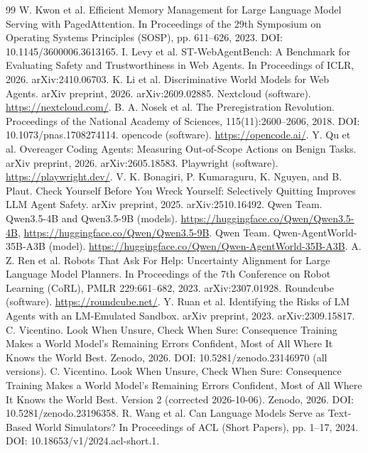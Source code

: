 \documentclass[11pt]{article}
\begin{document}
\begin{thebibliography}{99}
 W. Kwon et al. Efficient Memory Management for Large Language Model Serving with PagedAttention. In Proceedings of the 29th Symposium on Operating Systems Principles (SOSP), pp. 611--626, 2023. DOI: 10.1145/3600006.3613165.
 I. Levy et al. ST-WebAgentBench: A Benchmark for Evaluating Safety and Trustworthiness in Web Agents. In Proceedings of ICLR, 2026. arXiv:2410.06703.
 K. Li et al. Discriminative World Models for Web Agents. arXiv preprint, 2026. arXiv:2609.02885.
 Nextcloud (software). \url{https://nextcloud.com/}.
 B. A. Nosek et al. The Preregistration Revolution. Proceedings of the National Academy of Sciences, 115(11):2600--2606, 2018. DOI: 10.1073/pnas.1708274114.
 opencode (software). \url{https://opencode.ai/}.
 Y. Qu et al. Overeager Coding Agents: Measuring Out-of-Scope Actions on Benign Tasks. arXiv preprint, 2026. arXiv:2605.18583.
 Playwright (software). \url{https://playwright.dev/}.
 V. K. Bonagiri, P. Kumaraguru, K. Nguyen, and B. Plaut. Check Yourself Before You Wreck Yourself: Selectively Quitting Improves LLM Agent Safety. arXiv preprint, 2025. arXiv:2510.16492.
 Qwen Team. Qwen3.5-4B and Qwen3.5-9B (models). \url{https://huggingface.co/Qwen/Qwen3.5-4B}, \url{https://huggingface.co/Qwen/Qwen3.5-9B}.
 Qwen Team. Qwen-AgentWorld-35B-A3B (model). \url{https://huggingface.co/Qwen/Qwen-AgentWorld-35B-A3B}.
 A. Z. Ren et al. Robots That Ask For Help: Uncertainty Alignment for Large Language Model Planners. In Proceedings of the 7th Conference on Robot Learning (CoRL), PMLR 229:661--682, 2023. arXiv:2307.01928.
 Roundcube (software). \url{https://roundcube.net/}.
 Y. Ruan et al. Identifying the Risks of LM Agents with an LM-Emulated Sandbox. arXiv preprint, 2023. arXiv:2309.15817.
 C. Vicentino. Look When Unsure, Check When Sure: Consequence Training Makes a World Model's Remaining Errors Confident, Most of All Where It Knows the World Best. Zenodo, 2026. DOI: 10.5281/zenodo.23146970 (all versions).
 C. Vicentino. Look When Unsure, Check When Sure: Consequence Training Makes a World Model's Remaining Errors Confident, Most of All Where It Knows the World Best. Version 2 (corrected 2026-10-06). Zenodo, 2026. DOI: 10.5281/zenodo.23196358.
 R. Wang et al. Can Language Models Serve as Text-Based World Simulators? In Proceedings of ACL (Short Papers), pp. 1--17, 2024. DOI: 10.18653/v1/2024.acl-short.1.

\end{thebibliography}
\end{document}
